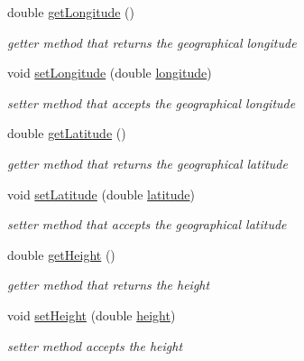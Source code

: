 \begin{DoxyCompactItemize}
double \hyperlink{classcoordinates_1_1_geographic_coordinate_interface_a4b2903f951a7ec80608cf6eb307a1991}{get\+Longitude} ()
\begin{DoxyCompactList}\small\item\em getter method that returns the geographical longitude \end{DoxyCompactList}\item 
void \hyperlink{classcoordinates_1_1_geographic_coordinate_interface_a37768130dfa4697eebbb93dbb639b78c}{set\+Longitude} (double \hyperlink{classcoordinates_1_1_geographic_coordinate_interface_ae82d3ae4819bc8e243ca54f6568ec005}{longitude})
\begin{DoxyCompactList}\small\item\em setter method that accepts the geographical longitude \end{DoxyCompactList}\item 
double \hyperlink{classcoordinates_1_1_geographic_coordinate_interface_a6c287f3c85afe73a269165862ec267fb}{get\+Latitude} ()
\begin{DoxyCompactList}\small\item\em getter method that returns the geographical latitude \end{DoxyCompactList}\item 
void \hyperlink{classcoordinates_1_1_geographic_coordinate_interface_ab10e03a921d5c7e821dda05d258628db}{set\+Latitude} (double \hyperlink{classcoordinates_1_1_geographic_coordinate_interface_a80705d81d2b4631d1ac928f703715d0c}{latitude})
\begin{DoxyCompactList}\small\item\em setter method that accepts the geographical latitude \end{DoxyCompactList}\item 
double \hyperlink{classcoordinates_1_1_geographic_coordinate_interface_aa74362408871d3bf33e69f6e2ffa52b6}{get\+Height} ()
\begin{DoxyCompactList}\small\item\em getter method that returns the height \end{DoxyCompactList}\item 
void \hyperlink{classcoordinates_1_1_geographic_coordinate_interface_a10e3f8411fd7085cd4abbb86e1d15891}{set\+Height} (double \hyperlink{classcoordinates_1_1_geographic_coordinate_interface_a172154f497767cdc832c1a851552bd8b}{height})
\begin{DoxyCompactList}\small\item\em setter method accepts the height \end{DoxyCompactList}\item 

\end{DoxyCompactItemize}
